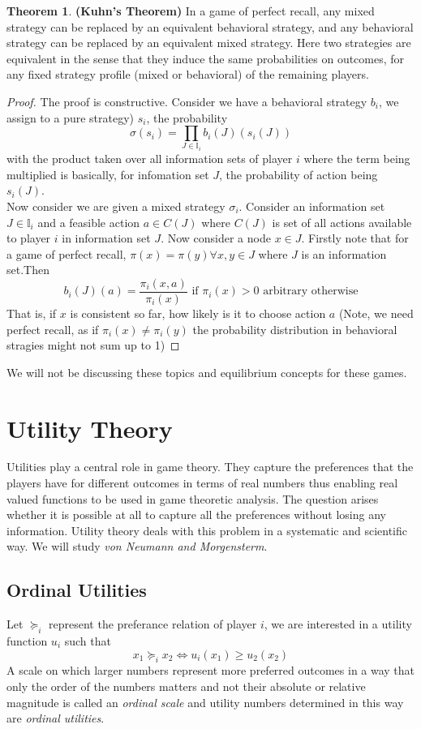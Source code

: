 \documentclass{article}
\theoremstyle{definition}
\newtheorem{theorem}{Theorem}[section]
\begin{document}
\begin{theorem}
\textbf{(Kuhn's Theorem)} In a game of perfect recall, any mixed strategy can be replaced by an equivalent behavioral strategy, and any behavioral strategy can be replaced by an equivalent mixed strategy. Here two strategies are equivalent in the sense that they induce the same probabilities on outcomes, for any fixed strategy profile (mixed or behavioral) of the remaining players.
\end{theorem}
\begin{proof}
The proof is constructive. Consider we have a behavioral strategy $b_i$, we assign to a pure strategy) $s_i$, the probability $$\sigma(s_i) = \prod_{J\in \mathbb{I}_i} b_i(J)(s_i(J))$$ with the product taken over all information sets of player $i$ where the term being multiplied is basically, for infomation set $J$, the probability of action being $s_i(J)$.\\
Now consider we are given a mixed strategy $\sigma_i$. Consider an information set $J\in\mathbb{I}_i$ and a feasible action $a\in C(J)$ where $C(J)$ is set of all actions available to player $i$ in information set $J$. Now consider a node $x\in J$. Firstly note that for a game of perfect recall, $\pi(x) = \pi(y) \forall x,y\in J$ where $J$ is an information set.Then $$b_i(J)(a) = \frac{\pi_i(x,a)}{\pi_i(x)} \text{ if } \pi_i(x)>0\text{ arbitrary otherwise}$$ That is, if $x$ is consistent so far, how likely is it to choose action $a$ (Note, we need perfect recall, as if $\pi_i(x) \neq \pi_i(y)$ the probability distribution in behavioral stragies might not sum up to 1)
\end{proof}
We will not be discussing these topics and equilibrium concepts for these games.
\section{Utility Theory}
Utilities play a central role in game theory. They capture the preferences that the players have for different outcomes in terms of real numbers thus enabling real valued functions to be used in game theoretic analysis. The question arises whether it is possible at all to capture all the preferences without losing any information. Utility theory deals with this problem in a systematic and scientific way. We will study \textit{von Neumann and Morgensterm}.
\subsection{Ordinal Utilities}
Let $\succeq_i$ represent the preferance relation of player $i$, we are interested in a utility function $u_i$ such that $$x_1 \succeq_i x_2 \iff u_i(x_1)\geq u_2(x_2)$$
A scale on which larger numbers represent more preferred outcomes in a way that only the order of the numbers matters and not their absolute or relative magnitude is called an \textit{ordinal scale} and utility numbers determined in this way are \textit{ordinal utilities}.\\
\end{document}
